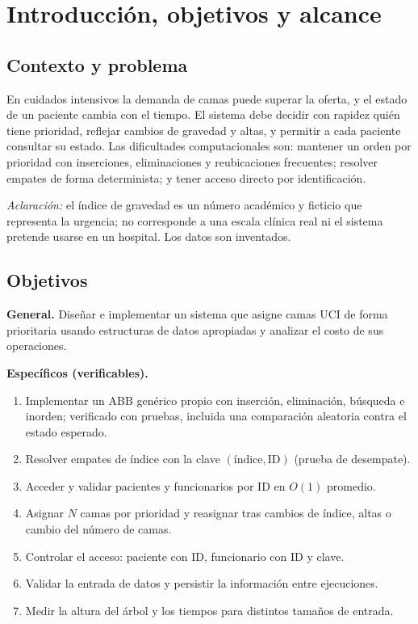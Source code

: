 \documentclass[11pt,a4paper]{article}
\begin{document}
\section{Introducción, objetivos y alcance}
\subsection{Contexto y problema}
En cuidados intensivos la demanda de camas puede superar la oferta, y el estado de un paciente cambia con el tiempo. El sistema debe decidir con rapidez quién tiene prioridad, reflejar cambios de gravedad y altas, y permitir a cada paciente consultar su estado. Las dificultades computacionales son: mantener un orden por prioridad con inserciones, eliminaciones y reubicaciones frecuentes; resolver empates de forma determinista; y tener acceso directo por identificación.

\emph{Aclaración:} el índice de gravedad es un número académico y ficticio que representa la urgencia; no corresponde a una escala clínica real ni el sistema pretende usarse en un hospital. Los datos son inventados.

\subsection{Objetivos}
\textbf{General.} Diseñar e implementar un sistema que asigne camas UCI de forma prioritaria usando estructuras de datos apropiadas y analizar el costo de sus operaciones.

\textbf{Específicos (verificables).}
\begin{enumerate}[nosep]
\item Implementar un ABB genérico propio con inserción, eliminación, búsqueda e inorden; verificado con pruebas, incluida una comparación aleatoria contra el estado esperado.
\item Resolver empates de índice con la clave $(\text{índice},\text{ID})$ (prueba de desempate).
\item Acceder y validar pacientes y funcionarios por ID en $O(1)$ promedio.
\item Asignar $N$ camas por prioridad y reasignar tras cambios de índice, altas o cambio del número de camas.
\item Controlar el acceso: paciente con ID, funcionario con ID y clave.
\item Validar la entrada de datos y persistir la información entre ejecuciones.
\item Medir la altura del árbol y los tiempos para distintos tamaños de entrada.
\end{enumerate}
\end{document}
